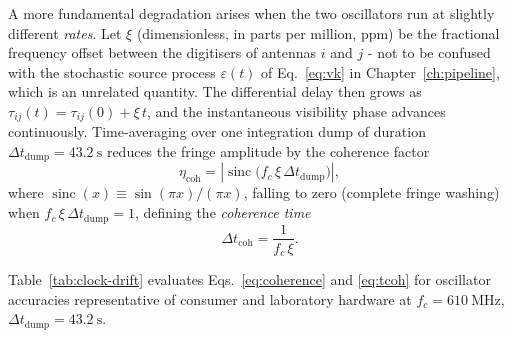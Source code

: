 A more fundamental degradation arises when the two oscillators run at slightly
different \emph{rates}. Let $\xi$ (dimensionless, in parts per million, ppm)
be the fractional frequency offset between the digitisers of antennas $i$ and $j$ -
not to be confused with the stochastic source process $\varepsilon(t)$ of
Eq.~\eqref{eq:vk} in Chapter~\ref{ch:pipeline}, which is an unrelated quantity. The
differential delay then grows as $\tau_{ij}(t)=\tau_{ij}(0)+\xi\,t$, and the
instantaneous visibility phase advances continuously. Time-averaging over one
integration dump of duration $\Delta t_{\mathrm{dump}}=\SI{43.2}{\second}$ reduces the
fringe amplitude by the coherence factor
\begin{equation}
  \eta_{\mathrm{coh}}
  = \left|\operatorname{sinc}\!\bigl(f_c\,\xi\,\Delta t_{\mathrm{dump}}\bigr)\right|,
  \label{eq:coherence}
\end{equation}
where $\operatorname{sinc}(x)\equiv\sin(\pi x)/(\pi x)$, falling to zero (complete
fringe washing) when $f_c\,\xi\,\Delta t_{\mathrm{dump}}=1$, defining the
\emph{coherence time}
\begin{equation}
  \Delta t_{\mathrm{coh}} = \frac{1}{f_c\,\xi}.
  \label{eq:tcoh}
\end{equation}

Table~\ref{tab:clock-drift} evaluates Eqs.~\eqref{eq:coherence} and
\eqref{eq:tcoh} for oscillator accuracies representative of consumer and
laboratory hardware at $f_c=\SI{610}{\mega\hertz}$,
$\Delta t_{\mathrm{dump}}=\SI{43.2}{\second}$.

